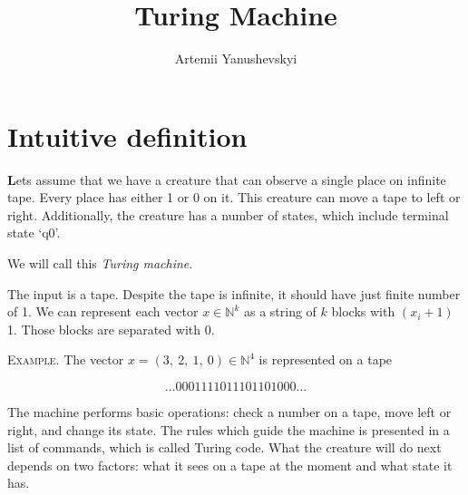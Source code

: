 \documentclass[12pt]{article}
\title{Turing Machine}
\author{Artemii Yanushevskyi}
\date{}                                           %
\newcommand\tab[1][-1em]{\hspace*{#1}}
\begin{document}
\maketitle


\section{Intuitive definition}
\textbf{\large L}ets assume that we have a creature that can observe a single place on infinite tape. Every place has either 1 or 0 on it. This creature can move a tape to left or right. Additionally, the creature has a number of states, which include terminal state ‘$\mathrm{q}0$’.

We will call this \emph{Turing machine}.

The input is a tape. Despite the tape is infinite, it should have just finite number of 1.
We can represent each vector $x\in\mathbb{N}^k$ as a string of $k$ blocks with $(x_i+1)$ 1. Those blocks are separated with 0. 
 
\begin{addmargin}[3em]{3em}
\tab
\textsc{Example.} The vector $x=(3,\ 2,\ 1,\ 0)\in\mathbb{N}^4$ is represented on a tape

{\large $$\dots 0001111011101101000\dots$$}

\end{addmargin}

The machine performs basic operations: check a number on a tape, move left or right, and change its state. The rules which guide the machine is presented in a list of commands, which is called Turing code. What the creature will do next depends on two factors: what it sees on a tape at the moment and what state it has.
 
\end{document}

